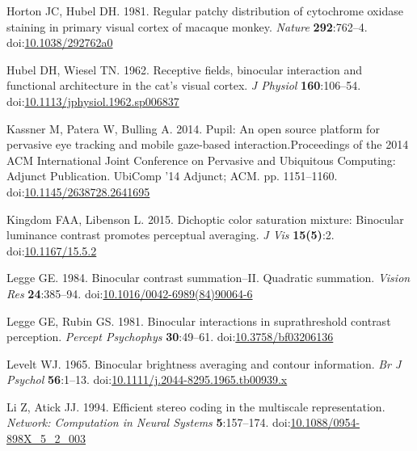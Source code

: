 \documentclass[
]{article}
\newlength{\cslhangindent}
\newlength{\cslentryspacingunit} %
\newenvironment{CSLReferences}[2] %
 {%
  \setlength{\parindent}{0pt}
  \ifodd #1
  \let\oldpar\par
  \def\par{\hangindent=\cslhangindent\oldpar}
  \fi
  \setlength{\parskip}{#2\cslentryspacingunit}
 }%
 {}
\begin{document}
\begin{CSLReferences}{1}{0}
\leavevmode{}%
Horton JC, Hubel DH. 1981. Regular patchy distribution of cytochrome oxidase staining in primary visual cortex of macaque monkey. \emph{Nature} \textbf{292}:762--4. doi:\href{https://doi.org/10.1038/292762a0}{10.1038/292762a0}

\leavevmode{}%
Hubel DH, Wiesel TN. 1962. Receptive fields, binocular interaction and functional architecture in the cat's visual cortex. \emph{J Physiol} \textbf{160}:106--54. doi:\href{https://doi.org/10.1113/jphysiol.1962.sp006837}{10.1113/jphysiol.1962.sp006837}

\leavevmode{}%
Kassner M, Patera W, Bulling A. 2014. Pupil: An open source platform for pervasive eye tracking and mobile gaze-based interaction.Proceedings of the 2014 {ACM} International Joint Conference on Pervasive and Ubiquitous Computing: Adjunct Publication. UbiComp '14 Adjunct; {ACM}. pp. 1151--1160. doi:\href{https://doi.org/10.1145/2638728.2641695}{10.1145/2638728.2641695}

\leavevmode{}%
Kingdom FAA, Libenson L. 2015. Dichoptic color saturation mixture: Binocular luminance contrast promotes perceptual averaging. \emph{J Vis} \textbf{15(5)}:2. doi:\href{https://doi.org/10.1167/15.5.2}{10.1167/15.5.2}

\leavevmode{}%
Legge GE. 1984. Binocular contrast summation--II. Quadratic summation. \emph{Vision Res} \textbf{24}:385--94. doi:\href{https://doi.org/10.1016/0042-6989(84)90064-6}{10.1016/0042-6989(84)90064-6}

\leavevmode{}%
Legge GE, Rubin GS. 1981. Binocular interactions in suprathreshold contrast perception. \emph{Percept Psychophys} \textbf{30}:49--61. doi:\href{https://doi.org/10.3758/bf03206136}{10.3758/bf03206136}

\leavevmode{}%
Levelt WJ. 1965. Binocular brightness averaging and contour information. \emph{Br J Psychol} \textbf{56}:1--13. doi:\href{https://doi.org/10.1111/j.2044-8295.1965.tb00939.x}{10.1111/j.2044-8295.1965.tb00939.x}

\leavevmode{}%
Li Z, Atick JJ. 1994. Efficient stereo coding in the multiscale representation. \emph{Network: Computation in Neural Systems} \textbf{5}:157--174. doi:\href{https://doi.org/10.1088/0954-898X_5_2_003}{10.1088/0954-898X\_5\_2\_003}


\end{CSLReferences}
\end{document}
